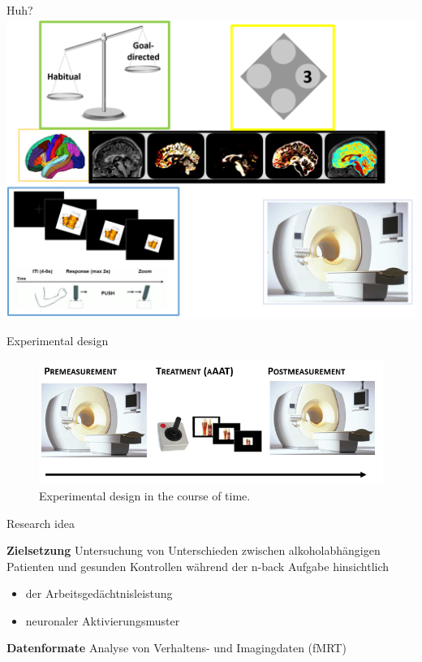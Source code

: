 \documentclass{bredelebeamer}
\begin{document}
\begin{frame}{Huh?}
\hspace{7mm}
 \includegraphics[scale=0.37]{images/huh2.PNG}
\end{frame}
\begin{frame}{Experimental design}
\begin{figure}
       \includegraphics[scale=0.55]{images/expdesign.PNG}
       \caption{Experimental design in the course of time.}
 
\end{figure}
\end{frame}

\begin{frame}{Research idea}
\begin{block}{\textbf{ Zielsetzung}}
 Untersuchung von Unterschieden zwischen alkoholabhängigen Patienten und gesunden Kontrollen während der n-back Aufgabe hinsichtlich 
\begin{itemize}
    \item der Arbeitsgedächtnisleistung 
    \item  neuronaler Aktivierungsmuster 
    \end{itemize}
    \end{block}
\begin{exampleblock}{\textbf{{Datenformate}}}
 Analyse von Verhaltens- und Imagingdaten (fMRT)
\end{exampleblock}
\end{frame}
\end{document}
